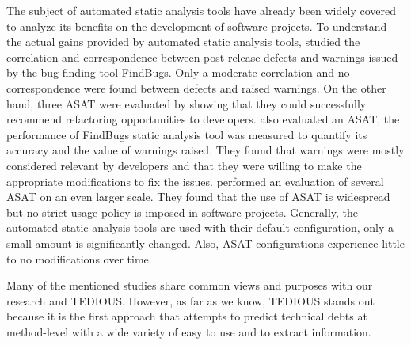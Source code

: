The subject of automated static analysis tools have already been widely covered to analyze its benefits on the development of software projects. To understand the actual gains provided by automated static analysis tools, \citet{couto2013static} studied the correlation and correspondence between post-release defects and warnings issued by the bug finding tool FindBugs. Only a moderate correlation and no correspondence were found between defects and raised warnings. On the other hand, three \ac{ASAT} were evaluated by \citet{wedyan2009effectiveness} showing that they could successfully recommend refactoring opportunities to developers. \citet{ayewah2007evaluating} also evaluated an ASAT, the performance of FindBugs static analysis tool was measured to quantify its accuracy and the value of warnings raised. They found that warnings were mostly considered relevant by developers and that they were willing to make the appropriate modifications to fix the issues. \citet{BellerBMZ16} performed an evaluation of several ASAT on an even larger scale. They found that the use of \ac{ASAT} is widespread but no strict usage policy is imposed in software projects. Generally, the automated static analysis tools are used with their default configuration, only a small amount is significantly changed. Also, \ac{ASAT} configurations experience little to no modifications over time. \par 

Many of the mentioned studies share common views and purposes with our research and \ac{TEDIOUS}. However, as far as we know, TEDIOUS stands out because it is the first approach that attempts to predict technical debts at method-level with a wide variety of easy to use and to extract information.













